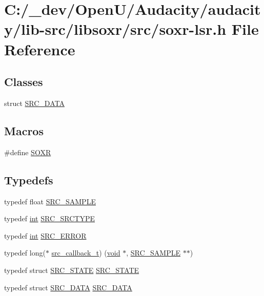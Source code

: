 \hypertarget{soxr-lsr_8h}{}\section{C\+:/\+\_\+dev/\+Open\+U/\+Audacity/audacity/lib-\/src/libsoxr/src/soxr-\/lsr.h File Reference}
\label{soxr-lsr_8h}
\subsection*{Classes}
\begin{DoxyCompactItemize}
\item 
struct \hyperlink{struct_s_r_c___d_a_t_a}{S\+R\+C\+\_\+\+D\+A\+TA}
\end{DoxyCompactItemize}
\subsection*{Macros}
\begin{DoxyCompactItemize}
\item 
\#define \hyperlink{soxr-lsr_8h_a9c39f225365ddf49e46ae9e6ae9b990a}{S\+O\+XR}
\end{DoxyCompactItemize}
\subsection*{Typedefs}
\begin{DoxyCompactItemize}
\item 
typedef float \hyperlink{soxr-lsr_8h_aeed0ef55cbeaa78637727866e9ea4be8}{S\+R\+C\+\_\+\+S\+A\+M\+P\+LE}
\item 
typedef \hyperlink{xmltok_8h_a5a0d4a5641ce434f1d23533f2b2e6653}{int} \hyperlink{soxr-lsr_8h_a2e2a328e11ac7ce361f7e02d854a172f}{S\+R\+C\+\_\+\+S\+R\+C\+T\+Y\+PE}
\item 
typedef \hyperlink{xmltok_8h_a5a0d4a5641ce434f1d23533f2b2e6653}{int} \hyperlink{soxr-lsr_8h_a430d922cd937a18ab0bce9f817baecfe}{S\+R\+C\+\_\+\+E\+R\+R\+OR}
\item 
typedef long($\ast$ \hyperlink{soxr-lsr_8h_a31bec2c13aee016a1c3855a75e757f11}{src\+\_\+callback\+\_\+t}) (\hyperlink{sound_8c_ae35f5844602719cf66324f4de2a658b3}{void} $\ast$, \hyperlink{soxr-lsr_8h_aeed0ef55cbeaa78637727866e9ea4be8}{S\+R\+C\+\_\+\+S\+A\+M\+P\+LE} $\ast$$\ast$)
\item 
typedef struct \hyperlink{lsr_8c_af3b690745d177a40cb1ba01f5804378b}{S\+R\+C\+\_\+\+S\+T\+A\+TE} \hyperlink{soxr-lsr_8h_a9bbd7df535efdabb27f27451f387e0d8}{S\+R\+C\+\_\+\+S\+T\+A\+TE}
\item 
typedef struct \hyperlink{struct_s_r_c___d_a_t_a}{S\+R\+C\+\_\+\+D\+A\+TA} \hyperlink{soxr-lsr_8h_a40d70d41aa6136a51d313b8282dea773}{S\+R\+C\+\_\+\+D\+A\+TA}
\end{DoxyCompactItemize}
